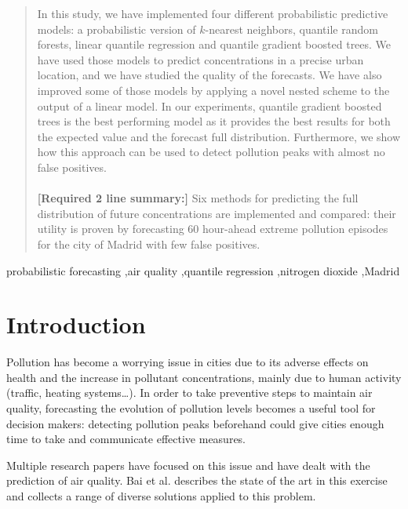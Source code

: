 \documentclass[a4paper,3p,sort&compress]{elsarticle}
\begin{document}
\begin{frontmatter}
\begin{abstract}
  In this study, we have %
  implemented four different probabilistic predictive models: a
  probabilistic version of $k$-nearest neighbors, quantile random
  forests, linear quantile regression and quantile gradient boosted
  trees.  We have used those models to predict \no concentrations in a
  precise urban location,
  and we have studied the quality of the forecasts.  We have also
  improved some of those models by applying a novel nested scheme to
  the output of a linear model. In our experiments, quantile gradient
  boosted trees is the best performing model as it provides the best
  results for both the expected value and the forecast full
  distribution. Furthermore, we show how this approach can be used to
  detect pollution peaks with almost no false positives.\\\\
  \textbf{[Required 2 line summary:]} Six methods for
  predicting the full distribution of future \no concentrations are
  implemented and compared: their utility is proven by forecasting 60
  hour-ahead extreme pollution episodes for the city of Madrid with few
  false positives.
\end{abstract}

\begin{keyword}
probabilistic forecasting \sep air quality \sep quantile regression
\sep nitrogen dioxide \sep Madrid
\end{keyword}

\end{frontmatter}


\section{Introduction }
\label{sec:intro}

Pollution has become a worrying issue in cities due to its adverse
effects on health and the increase in pollutant concentrations, mainly
due to human activity (traffic, heating systems\ldots). In order to
take preventive steps to maintain air quality, forecasting the
evolution of pollution levels becomes a useful tool for decision
makers: detecting pollution peaks beforehand could give cities enough
time to take and communicate effective measures.

Multiple research papers have focused on this issue and have dealt
with the prediction of air quality. Bai et al. \cite{bai_air_2018}
describes the state of the art in this exercise and collects a range
of diverse solutions applied to this problem.
\end{document}
